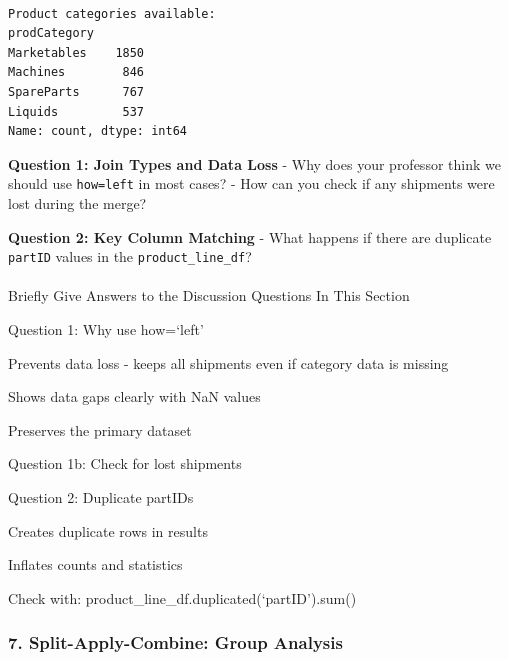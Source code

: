 \documentclass[
  letterpaper,
  DIV=11,
  numbers=noendperiod]{scrartcl}
\makeatletter
\let\oldparagraph\paragraph
\renewcommand{\paragraph}{
    \@ifstar
      \xxxParagraphStar
      \xxxParagraphNoStar
  }
\newcommand{\xxxParagraphStar}[1]{\oldparagraph*{#1}\mbox{}}
\newcommand{\xxxParagraphNoStar}[1]{\oldparagraph{#1}\mbox{}}
\makeatother
\begin{document}
\begin{verbatim}

Product categories available:
prodCategory
Marketables    1850
Machines        846
SpareParts      767
Liquids         537
Name: count, dtype: int64
\end{verbatim}

\begin{tcolorbox}[enhanced jigsaw, toptitle=1mm, opacityback=0, colframe=quarto-callout-important-color-frame, leftrule=.75mm, arc=.35mm, opacitybacktitle=0.6, breakable, titlerule=0mm, coltitle=black, bottomtitle=1mm, title=\textcolor{quarto-callout-important-color}{\faExclamation}\hspace{0.5em}{🤔 Discussion Questions: Merge Mental Model}, colbacktitle=quarto-callout-important-color!10!white, rightrule=.15mm, left=2mm, bottomrule=.15mm, toprule=.15mm, colback=white]

\textbf{Question 1: Join Types and Data Loss} - Why does your professor
think we should use
\texttt{how=\textquotesingle{}left\textquotesingle{}} in most cases? -
How can you check if any shipments were lost during the merge?

\textbf{Question 2: Key Column Matching} - What happens if there are
duplicate \texttt{partID} values in the \texttt{product\_line\_df}?

\end{tcolorbox}

\paragraph{Briefly Give Answers to the Discussion Questions In This
Section}\label{briefly-give-answers-to-the-discussion-questions-in-this-section-5}

Question 1: Why use how=`left'

Prevents data loss - keeps all shipments even if category data is
missing

Shows data gaps clearly with NaN values

Preserves the primary dataset

Question 1b: Check for lost shipments

Question 2: Duplicate partIDs

Creates duplicate rows in results

Inflates counts and statistics

Check with: product\_line\_df.duplicated(`partID').sum()

\subsubsection{7. Split-Apply-Combine: Group
Analysis}\label{split-apply-combine-group-analysis}
\end{document}
